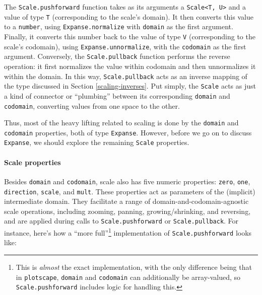 \documentclass[
  openany]{book}
\theoremstyle{definition}
\theoremstyle{definition}
\theoremstyle{definition}
\theoremstyle{definition}
\theoremstyle{remark}
\begin{document}
The \texttt{Scale.pushforward} function takes as its arguments a \texttt{Scale\textless{}T,\ U\textgreater{}} and a value of type \texttt{T} (corresponding to the scale's domain). It then converts this value to a \texttt{number}, using \texttt{Expanse.normalize} with \texttt{domain} as the first argument. Finally, it converts this number back to the value of type \texttt{V} (corresponding to the scale's codomain), using \texttt{Expanse.unnormalize}, with the \texttt{codomain} as the first argument. Conversely, the \texttt{Scale.pullback} function performs the reverse operation: it first normalizes the value within codomain and then unnormalizes it within the domain. In this way, \texttt{Scale.pullback} acts as an inverse mapping of the type discussed in Section \ref{scaling-inverses}. Put simply, the \texttt{Scale} acts as just a kind of connector or ``plumbing'' between its corresponding \texttt{domain} and \texttt{codomain}, converting values from one space to the other.

Thus, most of the heavy lifting related to scaling is done by the \texttt{domain} and \texttt{codomain} properties, both of type \texttt{Expanse}. However, before we go on to discuss \texttt{Expanse}, we should explore the remaining \texttt{Scale} properties.

\paragraph{Scale properties}\label{scale-properties}

Besides \texttt{domain} and \texttt{codomain}, scale also has five numeric properties: \texttt{zero}, \texttt{one}, \texttt{direction}, \texttt{scale}, and \texttt{mult}. These properties act as parameters of the (implicit) intermediate domain. They facilitate a range of domain-and-codomain-agnostic scale operations, including zooming, panning, growing/shrinking, and reversing, and are applied during calls to \texttt{Scale.pushforward} or \texttt{Scale.pullback}. For instance, here's how a ``more full''\footnote{This is \emph{almost} the exact implementation, with the only difference being that in \texttt{plotscape}, \texttt{domain} and \texttt{codomain} can additionally be array-valued, so \texttt{Scale.pushforward} includes logic for handling this.} implementation of \texttt{Scale.pushforward} looks like:
\end{document}
